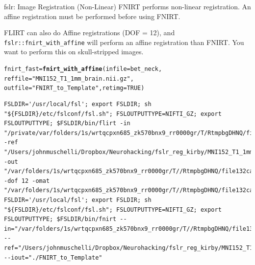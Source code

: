 \documentclass[11pt]{beamer}\usepackage[]{graphicx}\usepackage[]{color}
\makeatletter
\newcommand{\hlnum}[1]{\textcolor[rgb]{0.686,0.059,0.569}{#1}}%
\newcommand{\hlstr}[1]{\textcolor[rgb]{0.192,0.494,0.8}{#1}}%
\newcommand{\hlstd}[1]{\textcolor[rgb]{0.345,0.345,0.345}{#1}}%
\newcommand{\hlkwb}[1]{\textcolor[rgb]{0.69,0.353,0.396}{#1}}%
\newcommand{\hlkwc}[1]{\textcolor[rgb]{0.333,0.667,0.333}{#1}}%
\newcommand{\hlkwd}[1]{\textcolor[rgb]{0.737,0.353,0.396}{\textbf{#1}}}%
\newenvironment{kframe}{%
 \def\at@end@of@kframe{}%
 \ifinner\ifhmode%
  \def\at@end@of@kframe{\end{minipage}}%
  \begin{minipage}{\columnwidth}%
 \fi\fi%
 \def\FrameCommand##1{\hskip\@totalleftmargin \hskip-\fboxsep
 \colorbox{shadecolor}{##1}\hskip-\fboxsep
     \hskip-\linewidth \hskip-\@totalleftmargin \hskip\columnwidth}%
 \MakeFramed {\advance\hsize-\width
   \@totalleftmargin\z@ \linewidth\hsize
   \@setminipage}}%
 {\par\unskip\endMakeFramed%
 \at@end@of@kframe}
\newenvironment{knitrout}{}{} %
\makeatother
\begin{document}
\begin{frame}[fragile]{fslr: Image Registration (Non-Linear)}
FNIRT performs non-linear registration. An affine registration must be performed before using FNIRT.

FLIRT can also do Affine registrations (DOF = 12), and \verb|fslr::fnirt_with_affine| will perform an affine registration than FNIRT.  You want to perform this on skull-stripped images. 


\begin{knitrout}
\color{fgcolor}\begin{kframe}
\begin{alltt}
\hlstd{fnirt_fast} \hlkwb{=} \hlkwd{fnirt_with_affine}\hlstd{(}\hlkwc{infile}\hlstd{=bet_neck,}
                               \hlkwc{reffile} \hlstd{=} \hlstr{"MNI152_T1_1mm_brain.nii.gz"}\hlstd{,}
                               \hlkwc{outfile} \hlstd{=} \hlstr{"FNIRT_to_Template"}\hlstd{,} \hlkwc{retimg}\hlstd{=}\hlnum{TRUE}\hlstd{)}
\end{alltt}
\begin{verbatim}
FSLDIR='/usr/local/fsl'; export FSLDIR; sh "${FSLDIR}/etc/fslconf/fsl.sh"; FSLOUTPUTTYPE=NIFTI_GZ; export FSLOUTPUTTYPE; $FSLDIR/bin/flirt -in "/private/var/folders/1s/wrtqcpxn685_zk570bnx9_rr0000gr/T/RtmpbgDHNQ/file132ca479373b6.nii.gz" -ref "/Users/johnmuschelli/Dropbox/Neurohacking/fslr_reg_kirby/MNI152_T1_1mm_brain.nii.gz" -out "/var/folders/1s/wrtqcpxn685_zk570bnx9_rr0000gr/T//RtmpbgDHNQ/file132ca6524a03a" -dof 12 -omat "/var/folders/1s/wrtqcpxn685_zk570bnx9_rr0000gr/T//RtmpbgDHNQ/file132ca6649869c"  
FSLDIR='/usr/local/fsl'; export FSLDIR; sh "${FSLDIR}/etc/fslconf/fsl.sh"; FSLOUTPUTTYPE=NIFTI_GZ; export FSLOUTPUTTYPE; $FSLDIR/bin/fnirt --in="/var/folders/1s/wrtqcpxn685_zk570bnx9_rr0000gr/T//RtmpbgDHNQ/file132ca6524a03a" --ref="/Users/johnmuschelli/Dropbox/Neurohacking/fslr_reg_kirby/MNI152_T1_1mm_brain.nii.gz" --iout="./FNIRT_to_Template"  
\end{verbatim}
\end{kframe}
\end{knitrout}
\end{frame}
\end{document}
